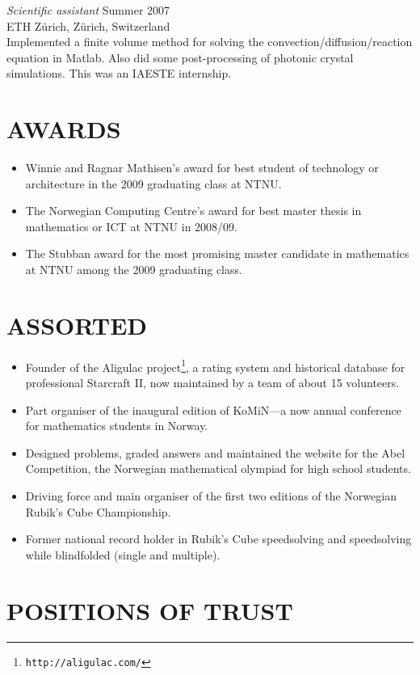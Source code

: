 \documentclass[line,margin]{res}
\newcommand{\zh}{Z\"{u}rich}
\begin{document}
\begin{resume}
{\em Scientific assistant} \hfill Summer 2007 \\
ETH \zh, \zh, Switzerland \\
Implemented a finite volume method for solving the convection/diffusion/reaction equation in
Matlab. Also did some post-processing of photonic crystal simulations. This was an IAESTE
internship.

\newpage

\section{AWARDS}

\begin{itemize}
\item Winnie and Ragnar Mathisen's award for best student of technology
  or architecture in the 2009 graduating class at NTNU.
\item The Norwegian Computing Centre's award for best master thesis in
  mathematics or ICT at NTNU in 2008/09.
\item The Stubban award for the most promising master candidate in
  mathematics at NTNU among the 2009 graduating class.
\end{itemize}


\section{ASSORTED}

\begin{itemize}
\item Founder of the Aligulac project\footnote{{\tt http://aligulac.com/}}, a rating system and
  historical database for professional Starcraft II, now maintained by a team of about 15 volunteers.
\item Part organiser of the inaugural edition of KoMiN---a now annual conference for mathematics
  students in Norway.
\item Designed problems, graded answers and maintained the website for the Abel Competition, the
  Norwegian mathematical olympiad for high school students.
\item Driving force and main organiser of the first two editions of the Norwegian Rubik's Cube
  Championship.
\item Former national record holder in Rubik's Cube speedsolving and speedsolving while blindfolded
  (single and multiple).
\end{itemize}


\section{POSITIONS OF TRUST}


\end{resume}
\end{document}
